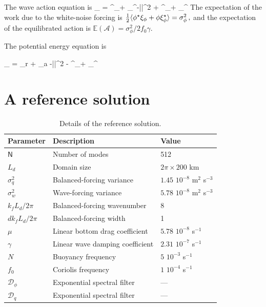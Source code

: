 \documentclass[12pt]{article}
\newcommand{\D}{\mathcal{D}}
\newcommand{\phis}{\phi^\star}
\renewcommand{\P}{\mathcal{P}}
\newcommand{\A}{  \mathcal{A}}
\newcommand{\Ep}{\mathbb{E}}
\begin{document}
The wave action equation is
\beq
{} _{ \A} = \la \phis \xi_\phi +
\phi \xi_\phis \ra -\gamma \la |\phi|^2 \ra +  \la \phis\D_\phi + \phi\D_\phis \ra\per
\label{A}
\eeq
The expectation of the work due to the white-noise forcing is $ \tfrac{1}{2}\la \phis \xi_\phi+\phi \xi_\phis \ra = \sigma_\phi^2\com$
and the expectation of the equilibrated action is $\Ep(\A) = \sigma_\phi^2/2f_0\gamma$.

The potential energy equation  is

\beq
{} _{ \P} = \Gamma_r + \Gamma_a
 -\gamma \la |\nabla\phi|^2 \ra -  \la \lap\phis\D_\phi + \lap\phi\D_\phis \ra\per
\label{P}
\eeq

\section{A reference solution}

\begin{table}
 \begin{center}
   \caption{Details of the reference solution.}
   \label{parameters_reference}
   \begin{tabular}{ l | l | l }
     \hline
      Parameter & Description & Value \\
      \hline
      $\mathsf{N}$   & Number of modes &  512  \\
      $L_d$ & Domain size & $2\pi\times 200$ km \\
      $\sigma_q^2$ & Balanced-forcing variance & $1.45\,\,10^{-8}$ m$^2$ s$^{-3}$ \\
      $\sigma_w^2$ & Wave-forcing variance & $5.78\,\,10^{-8}$ m$^2$ s$^{-3}$ \\
      $k_f L_d/2\pi$    & Balanced-forcing wavenumber & 8 \\
      ${dk}_f L_d/2\pi$    & Balanced-forcing width &  1 \\
      $\mu$ & Linear bottom drag coefficient & $5.78\,\,10^{-8}$ s$^{-1}$ \\
      $\gamma$ & Linear wave damping coefficient & $2.31\,\,10^{-7}$ s$^{-1}$ \\
      $N$ & Buoyancy frequency &  $5\,\,10^{-3}$ s$^{-1}$\\
      $f_0$ & Coriolis frequency &  $1\,\,10^{-4}$ s$^{-1}$\\
      $\D_\phi$ & Exponential spectral filter & ---\\
      $\D_q$ & Exponential spectral filter & ---\\
   \end{tabular}
 \end{center}
\end{table}
\end{document}

